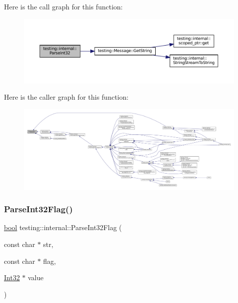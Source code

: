 Here is the call graph for this function\+:
\nopagebreak
\begin{figure}[H]
\begin{center}
\leavevmode
\includegraphics[width=350pt]{namespacetesting_1_1internal_ac06fc81336a3d80755f4020d34321766_cgraph}
\end{center}
\end{figure}
Here is the caller graph for this function\+:
\nopagebreak
\begin{figure}[H]
\begin{center}
\leavevmode
\includegraphics[width=350pt]{namespacetesting_1_1internal_ac06fc81336a3d80755f4020d34321766_icgraph}
\end{center}
\end{figure}
\mbox{\label{namespacetesting_1_1internal_ae3449e173767750b613114ceac6d916a}} 
\subsubsection{\texorpdfstring{Parse\+Int32\+Flag()}{ParseInt32Flag()}}
{\footnotesize\ttfamily \hyperlink{classbool}{bool} testing\+::internal\+::\+Parse\+Int32\+Flag (\begin{DoxyParamCaption}\item[{const char $\ast$}]{str,  }\item[{const char $\ast$}]{flag,  }\item[{\hyperlink{namespacetesting_1_1internal_a8ee38faaf875f133358abaf9bc056cec}{Int32} $\ast$}]{value }\end{DoxyParamCaption})}



